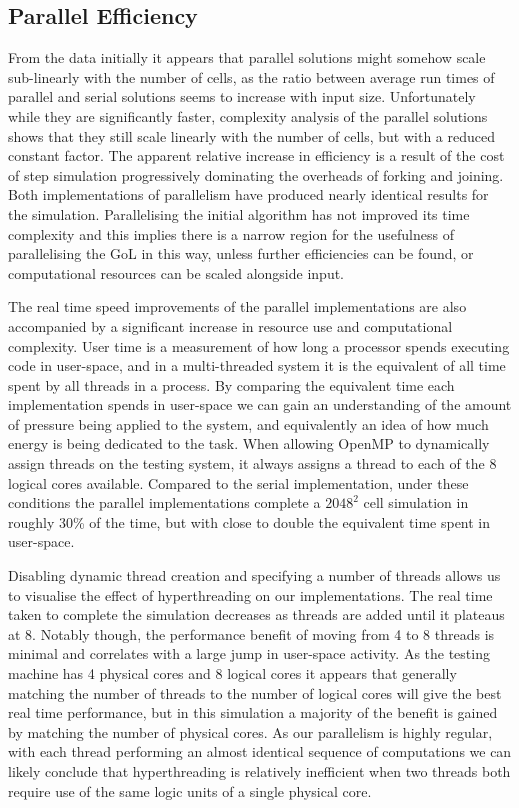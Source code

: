 \documentclass[]{article}
\begin{document}
\subsection{Parallel Efficiency}
From the data initially it appears that parallel solutions might somehow scale sub-linearly with the number of cells, as the ratio between average run times of parallel and serial solutions seems to increase with input size. Unfortunately while they are significantly faster, complexity analysis of the parallel solutions shows that they still scale linearly with the number of cells, but with a reduced constant factor. The apparent relative increase in efficiency is a result of the cost of step simulation progressively dominating the overheads of forking and joining. Both implementations of parallelism have produced nearly identical results for the simulation. Parallelising the initial algorithm has not improved its time complexity and this implies there is a narrow region for the usefulness of parallelising the GoL in this way, unless further efficiencies can be found, or computational resources can be scaled alongside input.

The real time speed improvements of the parallel implementations are also accompanied by a significant increase in resource use and computational complexity. User time is a measurement of how long a processor spends executing code in user-space, and in a multi-threaded system it is the equivalent of all time spent by all threads in a process. By comparing the equivalent time each implementation spends in user-space we can gain an understanding of the amount of pressure being applied to the system, and equivalently an idea of how much energy is being dedicated to the task. When allowing OpenMP to dynamically assign threads on the testing system, it always assigns a thread to each of the 8 logical cores available. Compared to the serial implementation, under these conditions the parallel implementations complete a $2048^2$ cell simulation in roughly 30\% of the time, but with close to double the equivalent time spent in user-space.

Disabling dynamic thread creation and specifying a number of threads allows us to visualise the effect of hyperthreading on our implementations. The real time taken to complete the simulation decreases as threads are added until it plateaus at 8. Notably though, the performance benefit of moving from 4 to 8 threads is minimal and correlates with a large jump in user-space activity. As the testing machine has 4 physical cores and 8 logical cores it appears that generally matching the number of threads to the number of logical cores will give the best real time performance, but in this simulation a majority of the benefit is gained by matching the number of physical cores. As our parallelism is highly regular, with each thread performing an almost identical sequence of computations we can likely conclude that hyperthreading is relatively inefficient when two threads both require use of the same logic units of a single physical core.
\end{document}
